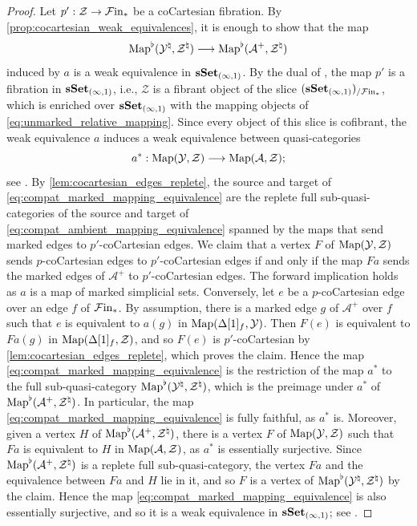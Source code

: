 \documentclass[10pt,reqno]{amsart}
\begin{document}
\begin{proof}
Let $p':\mathcal Z\to \mathcal{F}\mathrm{in}_*$ be a coCartesian fibration. By
\cref{prop:cocartesian_weak_equivalences}, it is enough to show that
the map
\begin{equation}
\label{eq:compat_marked_mapping_equivalence}
 \operatorname{Map}^\flat(\mathcal Y^\natural,\mathcal Z^\natural)
 \longrightarrow
 \operatorname{Map}^\flat(\mathcal A^+,\mathcal Z^\natural)
\end{equation}
induced by $a$ is a weak equivalence in $\mathbf{sSet}_{(\infty,1)}$. By
the dual of \cite[Proposition~3.3.1.7]{lurie2009higher}, the map
$p'$ is a fibration in $\mathbf{sSet}_{(\infty,1)}$, i.e., $\mathcal Z$
is a fibrant object of the slice $(\mathbf{sSet}_{(\infty,1)})_{/\mathcal{F}\mathrm{in}_*}$,
which is enriched over $\mathbf{sSet}_{(\infty,1)}$ with the mapping objects
of \eqref{eq:unmarked_relative_mapping}. Since every object of this
slice is cofibrant, the weak equivalence $a$ induces a weak
equivalence between quasi-categories
\begin{equation}
\label{eq:compat_ambient_mapping_equivalence}
 a^*:\operatorname{Map}(\mathcal Y,\mathcal Z)\longrightarrow\operatorname{Map}(\mathcal A,\mathcal Z);
\end{equation}
see \cite[Corollary~7.7.2\textup{(2)}]{hirschhorn2003model}. By
\cref{lem:cocartesian_edges_replete}, the source and target of
\eqref{eq:compat_marked_mapping_equivalence} are the replete full
sub-quasi-categories of the source and target of
\eqref{eq:compat_ambient_mapping_equivalence} spanned by the maps that
send marked edges to $p'$-coCartesian edges. We claim that a vertex
$F$ of $\operatorname{Map}(\mathcal Y,\mathcal Z)$ sends $p$-coCartesian edges
to $p'$-coCartesian edges if and only if the map $Fa$ sends the
marked edges of $\mathcal A^+$ to $p'$-coCartesian edges. The
forward implication holds as $a$ is a map of marked simplicial sets.
Conversely, let $e$ be a $p$-coCartesian edge over an edge $f$
of $\mathcal{F}\mathrm{in}_*$. By assumption, there is a marked edge $g$ of
$\mathcal A^+$ over $f$ such that $e$ is equivalent to $a(g)$
in $\operatorname{Map}(\Delta[1]_f,\mathcal Y)$. Then $F(e)$ is equivalent to
$Fa(g)$ in $\operatorname{Map}(\Delta[1]_f,\mathcal Z)$, and so $F(e)$ is
$p'$-coCartesian by \cref{lem:cocartesian_edges_replete}, which
proves the claim. Hence the map
\eqref{eq:compat_marked_mapping_equivalence} is the restriction of the
map $a^*$ to the full sub-quasi-category
$\operatorname{Map}^\flat(\mathcal Y^\natural,\mathcal Z^\natural)$, which is the
preimage under $a^*$ of
$\operatorname{Map}^\flat(\mathcal A^+,\mathcal Z^\natural)$. In particular, the
map \eqref{eq:compat_marked_mapping_equivalence} is fully faithful, as
$a^*$ is. Moreover, given a vertex $H$ of
$\operatorname{Map}^\flat(\mathcal A^+,\mathcal Z^\natural)$, there is a vertex
$F$ of $\operatorname{Map}(\mathcal Y,\mathcal Z)$ such that $Fa$ is equivalent
to $H$ in $\operatorname{Map}(\mathcal A,\mathcal Z)$, as $a^*$ is essentially
surjective. Since
$\operatorname{Map}^\flat(\mathcal A^+,\mathcal Z^\natural)$ is a replete full
sub-quasi-category, the vertex $Fa$ and the equivalence between
$Fa$ and $H$ lie in it, and so $F$ is a vertex of
$\operatorname{Map}^\flat(\mathcal Y^\natural,\mathcal Z^\natural)$ by the claim.
Hence the map \eqref{eq:compat_marked_mapping_equivalence} is also
essentially surjective, and so it is a weak equivalence in
$\mathbf{sSet}_{(\infty,1)}$; see \cite[\S1.2.10]{lurie2009higher}.
\end{proof}
\end{document}
